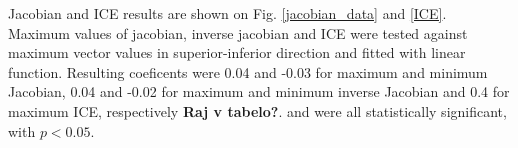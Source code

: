 \documentclass[type=dr, dr=rernat, accentcolor=tud7b,colorbacktitle, bigchapter, openright, twoside, 12pt ]{tudthesis}
\begin{document}
Jacobian and ICE results are shown on Fig. \ref{jacobian_data} and \ref{ICE}. Maximum values of jacobian, inverse jacobian and ICE were tested against maximum vector values in superior-inferior direction
and fitted with linear function. Resulting coeficents were 0.04 and -0.03 for maximum and minimum Jacobian, 0.04 and -0.02 for maximum and minimum inverse Jacobian and 0.4 for maximum ICE, respectively \textbf{Raj v tabelo?}. and were all statistically significant, with $p < 0.05$. 




\newpage
\end{document}
